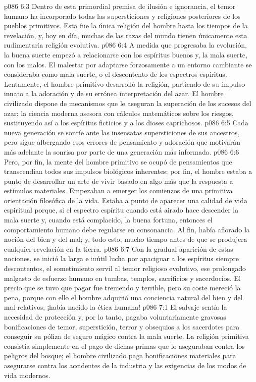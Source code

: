 \vs p086 6:3 Dentro de esta primordial premisa de ilusión e ignorancia, el temor humano ha incorporado todas las supersticiones y religiones posteriores de los pueblos primitivos. Esta fue la única religión del hombre hasta los tiempos de la revelación, y, hoy en día, muchas de las razas del mundo tienen únicamente esta rudimentaria religión evolutiva.
\vs p086 6:4 A medida que progresaba la evolución, la buena suerte empezó a relacionarse con los espíritus buenos y, la mala suerte, con los malos. El malestar por adaptarse forzosamente a un entorno cambiante se consideraba como mala suerte, o el descontento de los espectros espíritus. Lentamente, el hombre primitivo desarrolló la religión, partiendo de su impulso innato a la adoración y de su errónea interpretación del azar. El hombre civilizado dispone de mecanismos que le aseguran la superación de los sucesos del azar; la ciencia moderna asesora con cálculos matemáticos sobre los riesgos, sustituyendo así a los espíritus ficticios y a los dioses caprichosos.
\vs p086 6:5 Cada nueva generación se sonríe ante las insensatas supersticiones de sus ancestros, pero sigue albergando esos errores de pensamiento y adoración que motivarán más adelante la sonrisa por parte de una generación más informada.
\vs p086 6:6 \pc Pero, por fin, la mente del hombre primitivo se ocupó de pensamientos que transcendían todos sus impulsos biológicos inherentes; por fin, el hombre estaba a punto de desarrollar un arte de vivir basado en algo más que la respuesta a estímulos materiales. Empezaban a emerger los comienzos de una primitiva orientación filosófica de la vida. Estaba a punto de aparecer una calidad de vida espiritual porque, si el espectro espíritu cuando está airado hace descender la mala suerte y, cuando está complacido, la buena fortuna, entonces el comportamiento humano debe regularse en consonancia. Al fin, había aflorado la noción del bien y del mal; y, todo esto, mucho tiempo antes de que se produjera cualquier revelación en la tierra.
\vs p086 6:7 Con la gradual aparición de estas nociones, se inició la larga e inútil lucha por apaciguar a los espíritus siempre descontentos, el sometimiento servil al temor religioso evolutivo, ese prolongado malgasto de esfuerzo humano en tumbas, templos, sacrificios y sacerdocios. El precio que se tuvo que pagar fue tremendo y terrible, pero su coste mereció la pena, porque con ello el hombre adquirió una conciencia natural del bien y del mal relativos; ¡había nacido la ética humana!
\vs p086 7:1 El salvaje sentía la necesidad de protección y, por lo tanto, pagaba voluntariamente gravosas bonificaciones de temor, superstición, terror y obsequios a los sacerdotes para conseguir su póliza de seguro mágico contra la mala suerte. La religión primitiva consistía simplemente en el pago de dichas primas que lo aseguraban contra los peligros del bosque; el hombre civilizado paga bonificaciones materiales para asegurarse contra los accidentes de la industria y las exigencias de los modos de vida modernos.
